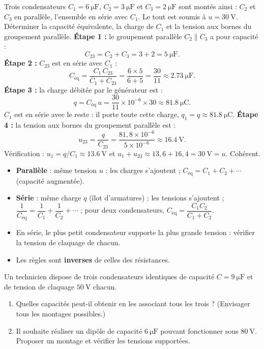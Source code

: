 \documentclass[11pt]{article}
\begin{document}
\begin{exoresolu}
Trois condensateurs $C_1 = \SI{6}{\micro\farad}$, $C_2 = \SI{3}{\micro\farad}$ et $C_3 = \SI{2}{\micro\farad}$ sont montés ainsi : $C_2$ et $C_3$ en parallèle, l'ensemble en série avec $C_1$. Le tout est soumis à $u = \SI{30}{\volt}$. Déterminer la capacité équivalente, la charge de $C_1$ et la tension aux bornes du groupement parallèle.
\tcblower
\textbf{Étape 1 :} le groupement parallèle $C_2 \parallel C_3$ a pour capacité :
\[ C_{23} = C_2 + C_3 = 3 + 2 = \SI{5}{\micro\farad}. \]
\textbf{Étape 2 :} $C_{23}$ est en série avec $C_1$ :
\[ C_{\text{éq}} = \frac{C_1\,C_{23}}{C_1 + C_{23}} = \frac{6\times 5}{6 + 5} = \frac{30}{11} \approx \SI{2,73}{\micro\farad}. \]
\textbf{Étape 3 :} la charge débitée par le générateur est :
\[ q = C_{\text{éq}}\,u = \frac{30}{11}\times 10^{-6}\times 30 \approx \SI{81,8}{\micro\coulomb}. \]
$C_1$ est en série avec le reste : il porte toute cette charge, $q_1 = q \approx \SI{81,8}{\micro\coulomb}$.
\textbf{Étape 4 :} la tension aux bornes du groupement parallèle est :
\[ u_{23} = \frac{q}{C_{23}} = \frac{81{,}8\times 10^{-6}}{5\times 10^{-6}} \approx \SI{16,4}{\volt}. \]
Vérification : $u_1 = q/C_1 \approx \SI{13,6}{\volt}$ et $u_1 + u_{23} \approx 13{,}6 + 16{,}4 = \SI{30}{\volt} = u$. Cohérent.
\end{exoresolu}

\begin{aretenir}
\begin{itemize}
\item \textbf{Parallèle} : même tension $u$ ; les charges s'ajoutent ; $C_{\text{éq}} = C_1 + C_2 + \cdots$ (capacité augmentée).
\item \textbf{Série} : même charge $q$ (îlot d'armatures) ; les tensions s'ajoutent ; $\dfrac{1}{C_{\text{éq}}} = \dfrac{1}{C_1} + \dfrac{1}{C_2} + \cdots$ ; pour deux condensateurs, $C_{\text{éq}} = \dfrac{C_1 C_2}{C_1 + C_2}$.
\item En série, le plus petit condensateur supporte la plus grande tension : vérifier la tension de claquage de chacun.
\item Les règles sont \textbf{inverses} de celles des résistances.
\end{itemize}
\end{aretenir}

\begin{exercice}
Un technicien dispose de trois condensateurs identiques de capacité $C = \SI{9}{\micro\farad}$ et de tension de claquage $\SI{50}{\volt}$ chacun.
\begin{enumerate}
\item Quelles capacités peut-il obtenir en les associant tous les trois ? (Envisager tous les montages possibles.)
\item Il souhaite réaliser un dipôle de capacité $\SI{6}{\micro\farad}$ pouvant fonctionner sous $\SI{80}{\volt}$. Proposer un montage et vérifier les tensions supportées.
\end{enumerate}
\end{exercice}
\end{document}
